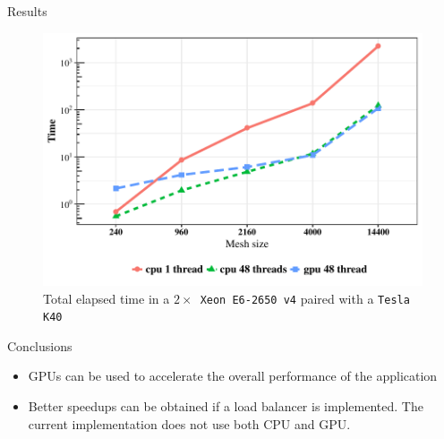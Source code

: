 \documentclass{beamer}
\begin{document}
\begin{frame}[fragile]
\begin{columns}[T]
\begin{column}{.46\textwidth}
\begin{block}{Results}
\begin{figure}[ht]
	\centering
	\includegraphics[scale=1.5]{total_brucutuiv.pdf}
	\caption{Total elapsed time in a \texttt{$2\times$ Xeon E6-2650 v4} paired with a \texttt{Tesla K40}}
	\label{fig:total_brucutuiv}
\end{figure}

\end{block}

\begin{block}{Conclusions}\justifying
\begin{itemize}
	\item GPUs can be used to accelerate the overall performance of the application
	\item Better speedups can be obtained if a load balancer is implemented. The current implementation does not use both CPU and GPU.
\end{itemize}
\end{block}


\end{column}
\end{columns}


\end{frame}
\end{document}

